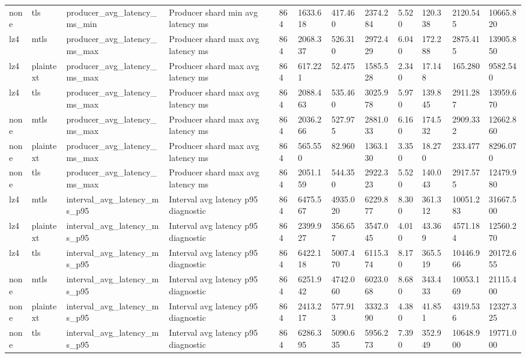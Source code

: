 \begin{longtable}{llllllllllll}
none & tls & producer\_avg\_latency\_ms\_min & Producer shard min avg latency ms & 864 & 1633.618 & 417.460 & 2374.284 & 5.520 & 120.338 & 2120.545 & 10665.820 \\
lz4 & mtls & producer\_avg\_latency\_ms\_max & Producer shard max avg latency ms & 864 & 2068.337 & 526.310 & 2972.429 & 6.040 & 172.288 & 2875.415 & 13905.850 \\
lz4 & plaintext & producer\_avg\_latency\_ms\_max & Producer shard max avg latency ms & 864 & 617.221 & 52.475 & 1585.528 & 2.340 & 17.148 & 165.280 & 9582.540 \\
lz4 & tls & producer\_avg\_latency\_ms\_max & Producer shard max avg latency ms & 864 & 2088.463 & 535.460 & 3025.978 & 5.970 & 139.845 & 2911.287 & 13959.670 \\
none & mtls & producer\_avg\_latency\_ms\_max & Producer shard max avg latency ms & 864 & 2036.266 & 527.975 & 2881.033 & 6.160 & 174.532 & 2909.332 & 12662.860 \\
none & plaintext & producer\_avg\_latency\_ms\_max & Producer shard max avg latency ms & 864 & 565.550 & 82.960 & 1363.130 & 3.350 & 18.270 & 233.477 & 8296.070 \\
none & tls & producer\_avg\_latency\_ms\_max & Producer shard max avg latency ms & 864 & 2051.159 & 544.350 & 2922.323 & 5.520 & 140.043 & 2917.575 & 12479.980 \\
lz4 & mtls & interval\_avg\_latency\_ms\_p95 & Interval avg latency p95 diagnostic & 864 & 6475.567 & 4935.020 & 6229.877 & 8.300 & 361.312 & 10051.283 & 31667.500 \\
lz4 & plaintext & interval\_avg\_latency\_ms\_p95 & Interval avg latency p95 diagnostic & 864 & 2399.927 & 356.657 & 3547.045 & 4.010 & 43.369 & 4571.184 & 12560.270 \\
lz4 & tls & interval\_avg\_latency\_ms\_p95 & Interval avg latency p95 diagnostic & 864 & 6422.118 & 5007.470 & 6115.374 & 8.170 & 365.519 & 10446.966 & 20172.655 \\
none & mtls & interval\_avg\_latency\_ms\_p95 & Interval avg latency p95 diagnostic & 864 & 6251.942 & 4742.060 & 6023.068 & 8.680 & 343.433 & 10053.169 & 21115.400 \\
none & plaintext & interval\_avg\_latency\_ms\_p95 & Interval avg latency p95 diagnostic & 864 & 2413.217 & 577.913 & 3332.390 & 4.380 & 41.851 & 4319.536 & 12327.325 \\
none & tls & interval\_avg\_latency\_ms\_p95 & Interval avg latency p95 diagnostic & 864 & 6286.395 & 5090.635 & 5956.273 & 7.390 & 352.949 & 10648.900 & 19771.000 \\

\end{longtable}

